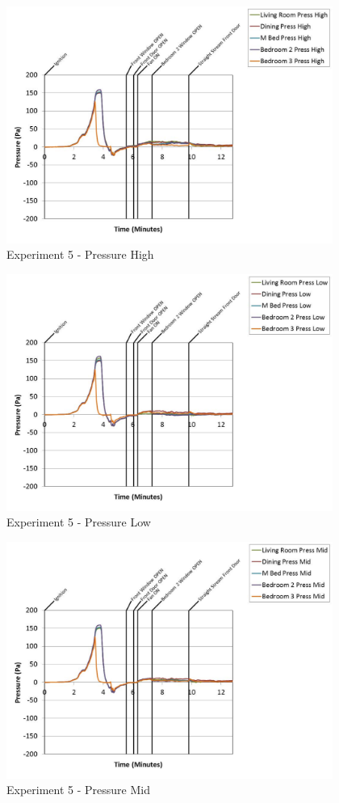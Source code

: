 \documentclass{article}
\begin{document}
\begin{appendices}
	\clearpage

	\begin{figure}[h!]
		\centering
		\includegraphics[height=3.05in]{0_Images/Results_Charts/Exp_5_Charts/PressureHigh.pdf}
		\caption{Experiment 5 - Pressure High}
	\end{figure}
 

	\begin{figure}[h!]
		\centering
		\includegraphics[height=3.05in]{0_Images/Results_Charts/Exp_5_Charts/PressureLow.pdf}
		\caption{Experiment 5 - Pressure Low}
	\end{figure}
 
	\clearpage

	\begin{figure}[h!]
		\centering
		\includegraphics[height=3.05in]{0_Images/Results_Charts/Exp_5_Charts/PressureMid.pdf}
		\caption{Experiment 5 - Pressure Mid}
	\end{figure}
 


\end{appendices}
\end{document}
